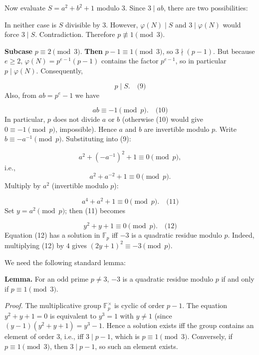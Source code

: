 Now evaluate \(S = a^{2}+b^{2}+1\) modulo \(3\). Since \(3 \mid ab\), there are two possibilities:\par
{}
In neither case is \(S\) divisible by \(3\). However, \(\varphi(N) \mid S\) and \(3 \mid \varphi(N)\) would force \(3 \mid S\). Contradiction. Therefore \(p \not\equiv 1 \pmod{3}\).\par
\textbf{Subcase }\(p \equiv 2 \pmod{3}\).\textbf{ Then }\(p-1 \equiv 1 \pmod{3}\), so \(3 \nmid (p-1)\). But because \(e \ge 2\), \(\varphi(N) = p^{e-1}(p-1)\) contains the factor \(p^{e-1}\), so in particular \(p \mid \varphi(N)\). Consequently,\par
\[
p \mid S. \quad\text{(9)}
\]
Also, from \(ab = p^{e} - 1\) we have\par
\[
ab \equiv -1 \pmod{p}. \quad\text{(10)}
\]
In particular, \(p\) does not divide \(a\) or \(b\) (otherwise (10) would give \(0 \equiv -1 \pmod{p}\), impossible). Hence \(a\) and \(b\) are invertible modulo \(p\). Write \(b \equiv -a^{-1} \pmod{p}\). Substituting into (9):\par
\[
a^{2} + (-a^{-1})^{2} + 1 \equiv 0 \pmod{p},
\]
i.e.,
\[
a^{2} + a^{-2} + 1 \equiv 0 \pmod{p}.
\]
Multiply by \(a^{2}\) (invertible modulo \(p\)):\par
\[
a^{4} + a^{2} + 1 \equiv 0 \pmod{p}. \quad\text{(11)}
\]
Set \(y = a^{2} \pmod{p}\); then (11) becomes\par
\[
y^{2} + y + 1 \equiv 0 \pmod{p}. \quad\text{(12)}
\]
Equation (12) has a solution in \(\mathbb{F}_p\) iff \(-3\) is a quadratic residue modulo \(p\). Indeed, multiplying (12) by \(4\) gives \((2y+1)^{2} \equiv -3 \pmod{p}\).\par
We need the following standard lemma:\par
\textbf{Lemma.} For an odd prime \(p \neq 3\), \(-3\) is a quadratic residue modulo \(p\) if and only if \(p \equiv 1 \pmod{3}\).\par
\emph{Proof.} The multiplicative group \(\mathbb{F}_p^{\times}\) is cyclic of order \(p-1\). The equation \(y^{2}+y+1=0\) is equivalent to \(y^{3}=1\) with \(y \neq 1\) (since \((y-1)(y^{2}+y+1)=y^{3}-1\). Hence a solution exists iff the group contains an element of order \(3\), i.e., iff \(3 \mid p-1\), which is \(p \equiv 1 \pmod{3}\). Conversely, if \(p \equiv 1 \pmod{3}\), then \(3 \mid p-1\), so such an element exists.\par
